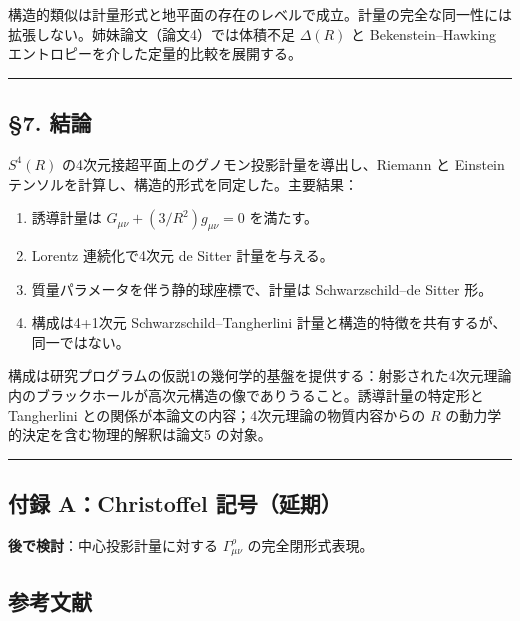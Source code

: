 \documentclass[a4paper,11pt]{ltjsarticle}
\theoremstyle{definition}
\providecommand{\tightlist}{\setlength{\itemsep}{0pt}\setlength{\parskip}{0pt}}
\begin{document}
構造的類似は計量形式と地平面の存在のレベルで成立。計量の完全な同一性には拡張しない。姉妹論文（論文4）では体積不足
\(\Delta(R)\) と Bekenstein--Hawking
エントロピーを介した定量的比較を展開する。

\begin{center}\rule{0.5\linewidth}{0.5pt}\end{center}

\subsection{§7. 結論}\label{ux7d50ux8ad6}

\(S^4(R)\) の4次元接超平面上のグノモン投影計量を導出し、Riemann と
Einstein テンソルを計算し、構造的形式を同定した。主要結果：

\begin{enumerate}
\def\labelenumi{\arabic{enumi}.}
\tightlist
\item
  誘導計量は \(G_{\mu\nu} + (3/R^2) g_{\mu\nu} = 0\) を満たす。
\item
  Lorentz 連続化で4次元 de Sitter 計量を与える。
\item
  質量パラメータを伴う静的球座標で、計量は Schwarzschild--de Sitter 形。
\item
  構成は4+1次元 Schwarzschild--Tangherlini
  計量と構造的特徴を共有するが、同一ではない。
\end{enumerate}

構成は研究プログラムの仮説1の幾何学的基盤を提供する：射影された4次元理論内のブラックホールが高次元構造の像でありうること。誘導計量の特定形と
Tangherlini との関係が本論文の内容；4次元理論の物質内容からの \(R\)
の動力学的決定を含む物理的解釈は論文5 の対象。

\begin{center}\rule{0.5\linewidth}{0.5pt}\end{center}

\subsection{付録 A：Christoffel
記号（延期）}\label{ux4ed8ux9332-achristoffel-ux8a18ux53f7ux5ef6ux671f}

\textbf{後で検討}：中心投影計量に対する \(\Gamma^\rho_{\mu\nu}\)
の完全閉形式表現。

\subsection{参考文献}\label{ux53c2ux8003ux6587ux732e}
\end{document}
